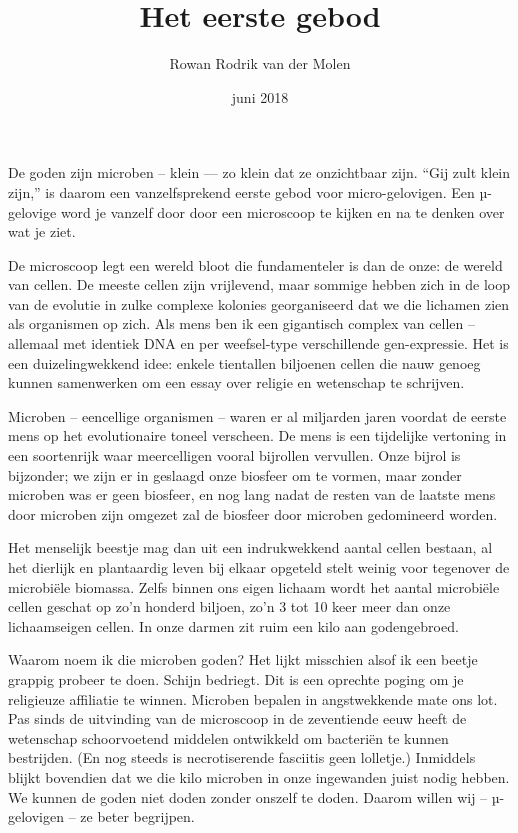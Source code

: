 \documentclass[12pt,a4paper]{article}
\begin{document}
\title{Het eerste gebod}
\author{Rowan Rodrik van der Molen}
\date{juni 2018}
\maketitle


De goden zijn microben – klein — zo klein dat ze onzichtbaar zijn. “Gij zult klein zijn,” is daarom een vanzelfsprekend eerste gebod voor micro-gelovigen. Een µ-gelovige word je vanzelf door door een microscoop te kijken en na te denken over wat je ziet.

De microscoop legt een wereld bloot die fundamenteler is dan de onze: de wereld van cellen. De meeste cellen zijn vrijlevend, maar sommige hebben zich in de loop van de evolutie in zulke complexe kolonies georganiseerd dat we die lichamen zien als organismen op zich. Als mens ben ik een gigantisch complex van cellen – allemaal met identiek DNA en per weefsel-type verschillende gen-expressie. Het is een duizelingwekkend idee: enkele tientallen biljoenen cellen die nauw genoeg kunnen samenwerken om een essay over religie en wetenschap te schrijven.

Microben – eencellige organismen – waren er al miljarden jaren voordat de eerste mens op het evolutionaire toneel verscheen. De mens is een tijdelijke vertoning in een soortenrijk waar meercelligen vooral bijrollen vervullen. Onze bijrol is bijzonder; we zijn er in geslaagd onze biosfeer om te vormen, maar zonder microben was er geen biosfeer, en nog lang nadat de resten van de laatste mens door microben zijn omgezet zal de biosfeer door microben gedomineerd worden.

Het menselijk beestje mag dan uit een indrukwekkend aantal cellen bestaan, al het dierlijk en plantaardig leven bij elkaar opgeteld stelt weinig voor tegenover de microbiële biomassa. Zelfs binnen ons eigen lichaam wordt het aantal microbiële cellen geschat op zo'n honderd biljoen, zo'n 3 tot 10 keer meer dan onze lichaamseigen cellen. In onze darmen zit ruim een kilo aan godengebroed.

Waarom noem ik die microben goden? Het lijkt misschien alsof ik een beetje grappig probeer te doen. Schijn bedriegt. Dit is een oprechte poging om je religieuze affiliatie te winnen. Microben bepalen in angstwekkende mate ons lot. Pas sinds de uitvinding van de microscoop in de zeventiende eeuw heeft de wetenschap schoorvoetend middelen ontwikkeld om bacteriën te kunnen bestrijden. (En nog steeds is necrotiserende fasciitis geen lolletje.) Inmiddels blijkt bovendien dat we die kilo microben in onze ingewanden juist nodig hebben. We kunnen de goden niet doden zonder onszelf te doden. Daarom willen wij – µ-gelovigen – ze beter begrijpen.
\end{document}
